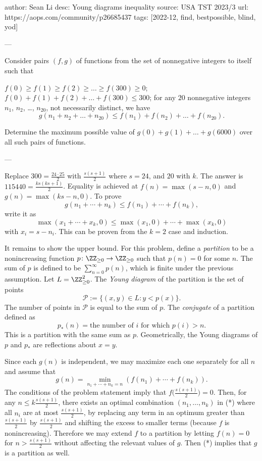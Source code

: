 author: Sean Li
desc: Young diagrams inequality
source: USA TST 2023/3
url: https://aops.com/community/p26685437
tags: [2022-12, find, bestpossible, blind, yod]

---

Consider pairs $(f,g)$ of functions
from the set of nonnegative integers to itself such that
\begin{itemize}
		\ii $f(0) \ge f(1) \ge f(2) \ge \dots \ge f(300) \ge 0$;
		\ii $f(0) + f(1) + f(2) + \dots + f(300) \leq 300$;
		\ii for any $20$ nonnegative integers $n_1$, $n_2$, \dots, $n_{20}$,
		not necessarily distinct, we have
		\[ g(n_1 + n_2 + \dots + n_{20}) \leq f(n_1) + f(n_2) + \dots + f(n_{20}). \]
\end{itemize}
Determine the maximum possible value of $g(0) + g(1) + \dots + g(6000)$
over all such pairs of functions.

---

Replace $300 = \frac{24 \cdot 25}{2}$ with $\frac{s(s+1)}{2}$ where $s=24$, and
$20$ with $k$. The answer is $115440 = \frac{ks(ks+1)}{2}$. Equality is achieved
at $f(n) = \max (s-n, 0)$ and $g(n) = \max (ks-n,0)$. To prove
\[g(n_1+\dotsb+n_k)\leq f(n_1)+\dotsb+f(n_k),\]
write it as
\[\max(x_1+\dotsb+x_k, 0)\leq \max(x_1, 0)+\dotsb+\max(x_k, 0)\]
with $x_i=s-n_i$. This can be proven from the $k=2$ case and induction.

\medskip

It remains to show the upper bound. For this problem, define a \emph{partition}
to be a nonincreasing function $p \colon \ZZ_{\geq 0}\to \ZZ_{\geq 0}$
such that $p(n)=0$ for some $n$. The sum of $p$ is defined to be
$\sum_{n=0}^{\infty}p(n)$, which is finite under the previous assumption. Let
$L=\ZZ_{\geq 0}^2$. The
\emph{Young diagram} of the partition is the set of points
\[\mathcal{P} := \{(x, y)\in L: y < p(x)\}.\]
The number of points in $\mathcal{P}$ is equal to the sum of $p$.
The \emph{conjugate} of a partition defined as
\[p_*(n) = \text{the number of $i$ for which $p(i) > n$}.\]
This is a partition with the same sum as $p$. Geometrically, the Young diagrams
of $p$ and $p_*$ are reflections about $x=y$.

Since each $g(n)$ is independent, we may
maximize each one separately for all $n$ and assume that
\[
  g(n) = \min_{n_1+\dotsb+n_k=n}(f(n_1)+\dotsb+f(n_k)) \tag{*}.
\]
The conditions of the problem statement imply that $f\big(\tfrac{s(s+1)}{2}\big)=0$.
Then, for any $n\leq k\frac{s(s+1)}{2}$, there exists an optimal combination
$(n_1, \dots, n_k)$ in (*) where all $n_i$ are at most $\frac{s(s+1)}{2}$, by
replacing any term in an optimum greater than $\frac{s(s+1)}{2}$ by
$\frac{s(s+1)}{2}$ and shifting the excess to smaller terms (because $f$ is
nonincreasing). Therefore we may extend $f$ to a partition by letting $f(n) = 0$
for $n > \frac{s(s+1)}{2}$ without affecting the relevant values of $g$. Then
(*) implies that $g$ is a partition as well.

